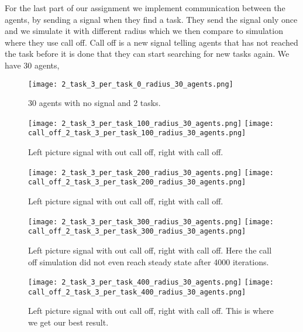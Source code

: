 \documentclass[a4paper]{article}
\begin{document}
For the last part of our assignment we implement communication between the agents, by sending a signal when they find a task. They send the signal only once and we simulate it with different radius which we then compare to simulation where they use call off. Call off is a new signal telling agents that has not reached the task before it is done that they can start searching for new tasks again. We have 30 agents, 


\begin{figure}[H]
  \centering
  \texttt{[image: 2\_task\_3\_per\_task\_0\_radius\_30\_agents.png]}
  \caption{30 agents with no signal and 2 tasks.}
  \label{20_task_3_per_task}
\end{figure}


\begin{figure}[H]
  \centering
  \texttt{[image: 2\_task\_3\_per\_task\_100\_radius\_30\_agents.png]}
   \label{non_random}
  \centering
  \texttt{[image: call\_off\_2\_task\_3\_per\_task\_100\_radius\_30\_agents.png]}
  \caption{Left picture signal with out call off, right with call off.}
  \label{random_walls}
\end{figure}


\begin{figure}[H]
  \centering
  \texttt{[image: 2\_task\_3\_per\_task\_200\_radius\_30\_agents.png]}
   \label{non_random}
  \centering
  \texttt{[image: call\_off\_2\_task\_3\_per\_task\_200\_radius\_30\_agents.png]}
  \caption{Left picture signal with out call off, right with call off.}
  \label{random_walls}
\end{figure}



\begin{figure}[H]
  \centering
  \texttt{[image: 2\_task\_3\_per\_task\_300\_radius\_30\_agents.png]}
   \label{non_random}
  \centering
  \texttt{[image: call\_off\_2\_task\_3\_per\_task\_300\_radius\_30\_agents.png]}
  \caption{Left picture signal with out call off, right with call off. Here the call off simulation did not even reach steady state after 4000 iterations.}
  \label{random_walls}
\end{figure}



\begin{figure}[H]
  \centering
  \texttt{[image: 2\_task\_3\_per\_task\_400\_radius\_30\_agents.png]}
   \label{non_random}
  \centering
  \texttt{[image: call\_off\_2\_task\_3\_per\_task\_400\_radius\_30\_agents.png]}
  \caption{Left picture signal with out call off, right with call off. This is where we get our best result.}
  \label{random_walls}
\end{figure}
\end{document}
